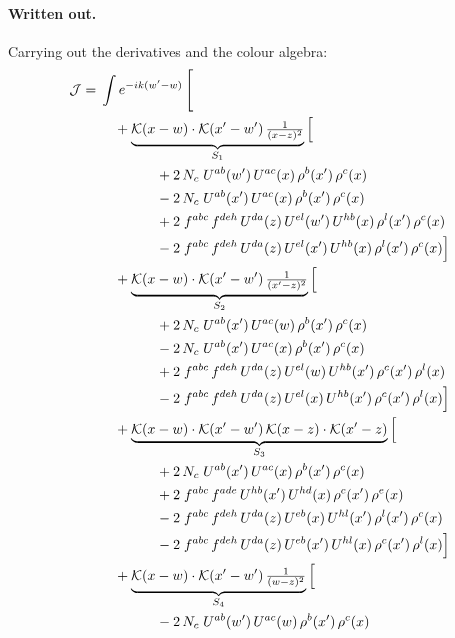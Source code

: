 \documentclass[10pt]{article}
\numberwithin{equation}{section}
\newcommand{\J}{\mathcal J}
\begin{document}
\paragraph{Written out.} Carrying out the derivatives and the colour algebra:
\begin{align}
\J={}&\int e^{-ik(w'-w)}\,\Bigg[\notag\\
&\quad +\underbrace{\mathcal{K}(x-w)\cdot\mathcal{K}(x'-w')\,\tfrac{1}{(x-z)^{2}}}_{S_{1}}\Big[\notag\\
&\qquad\qquad +2\,N_c\;U^{ab}(w')\,U^{ac}(x)\,\rho^{b}(x')\,\rho^{c}(x)\notag\\
&\qquad\qquad -2\,N_c\;U^{ab}(x')\,U^{ac}(x)\,\rho^{b}(x')\,\rho^{c}(x)\notag\\
&\qquad\qquad +2\;f^{abc}\,f^{deh}\,U^{da}(z)\,U^{el}(w')\,U^{hb}(x)\,\rho^{l}(x')\,\rho^{c}(x)\notag\\
&\qquad\qquad -2\;f^{abc}\,f^{deh}\,U^{da}(z)\,U^{el}(x')\,U^{hb}(x)\,\rho^{l}(x')\,\rho^{c}(x)\Big]\notag\\
&\quad +\underbrace{\mathcal{K}(x-w)\cdot\mathcal{K}(x'-w')\,\tfrac{1}{(x'-z)^{2}}}_{S_{2}}\Big[\notag\\
&\qquad\qquad +2\,N_c\;U^{ab}(x')\,U^{ac}(w)\,\rho^{b}(x')\,\rho^{c}(x)\notag\\
&\qquad\qquad -2\,N_c\;U^{ab}(x')\,U^{ac}(x)\,\rho^{b}(x')\,\rho^{c}(x)\notag\\
&\qquad\qquad +2\;f^{abc}\,f^{deh}\,U^{da}(z)\,U^{el}(w)\,U^{hb}(x')\,\rho^{c}(x')\,\rho^{l}(x)\notag\\
&\qquad\qquad -2\;f^{abc}\,f^{deh}\,U^{da}(z)\,U^{el}(x)\,U^{hb}(x')\,\rho^{c}(x')\,\rho^{l}(x)\Big]\notag\\
&\quad +\underbrace{\mathcal{K}(x-w)\cdot\mathcal{K}(x'-w')\,\mathcal{K}(x-z)\cdot\mathcal{K}(x'-z)}_{S_{3}}\Big[\notag\\
&\qquad\qquad +2\,N_c\;U^{ab}(x')\,U^{ac}(x)\,\rho^{b}(x')\,\rho^{c}(x)\notag\\
&\qquad\qquad +2\;f^{abc}\,f^{ade}\,U^{hb}(x')\,U^{hd}(x)\,\rho^{c}(x')\,\rho^{e}(x)\notag\\
&\qquad\qquad -2\;f^{abc}\,f^{deh}\,U^{da}(z)\,U^{eb}(x)\,U^{hl}(x')\,\rho^{l}(x')\,\rho^{c}(x)\notag\\
&\qquad\qquad -2\;f^{abc}\,f^{deh}\,U^{da}(z)\,U^{eb}(x')\,U^{hl}(x)\,\rho^{c}(x')\,\rho^{l}(x)\Big]\notag\\
&\quad +\underbrace{\mathcal{K}(x-w)\cdot\mathcal{K}(x'-w')\,\tfrac{1}{(w-z)^{2}}}_{S_{4}}\Big[\notag\\
&\qquad\qquad -2\,N_c\;U^{ab}(w')\,U^{ac}(w)\,\rho^{b}(x')\,\rho^{c}(x)\notag\\

\end{align}
\end{document}
